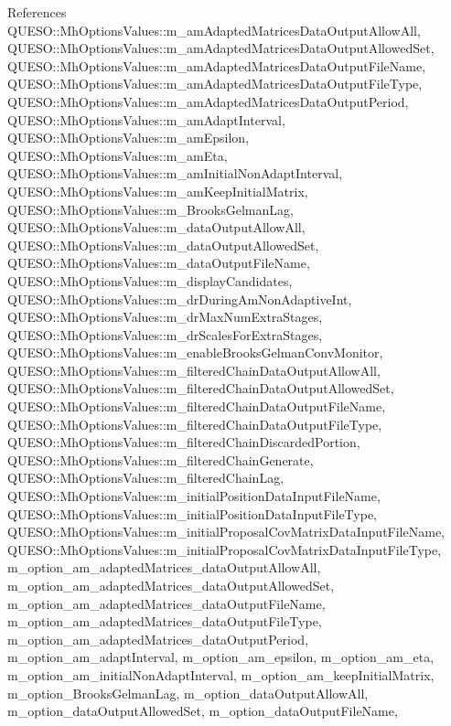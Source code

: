 References Q\-U\-E\-S\-O\-::\-Mh\-Options\-Values\-::m\-\_\-am\-Adapted\-Matrices\-Data\-Output\-Allow\-All, Q\-U\-E\-S\-O\-::\-Mh\-Options\-Values\-::m\-\_\-am\-Adapted\-Matrices\-Data\-Output\-Allowed\-Set, Q\-U\-E\-S\-O\-::\-Mh\-Options\-Values\-::m\-\_\-am\-Adapted\-Matrices\-Data\-Output\-File\-Name, Q\-U\-E\-S\-O\-::\-Mh\-Options\-Values\-::m\-\_\-am\-Adapted\-Matrices\-Data\-Output\-File\-Type, Q\-U\-E\-S\-O\-::\-Mh\-Options\-Values\-::m\-\_\-am\-Adapted\-Matrices\-Data\-Output\-Period, Q\-U\-E\-S\-O\-::\-Mh\-Options\-Values\-::m\-\_\-am\-Adapt\-Interval, Q\-U\-E\-S\-O\-::\-Mh\-Options\-Values\-::m\-\_\-am\-Epsilon, Q\-U\-E\-S\-O\-::\-Mh\-Options\-Values\-::m\-\_\-am\-Eta, Q\-U\-E\-S\-O\-::\-Mh\-Options\-Values\-::m\-\_\-am\-Initial\-Non\-Adapt\-Interval, Q\-U\-E\-S\-O\-::\-Mh\-Options\-Values\-::m\-\_\-am\-Keep\-Initial\-Matrix, Q\-U\-E\-S\-O\-::\-Mh\-Options\-Values\-::m\-\_\-\-Brooks\-Gelman\-Lag, Q\-U\-E\-S\-O\-::\-Mh\-Options\-Values\-::m\-\_\-data\-Output\-Allow\-All, Q\-U\-E\-S\-O\-::\-Mh\-Options\-Values\-::m\-\_\-data\-Output\-Allowed\-Set, Q\-U\-E\-S\-O\-::\-Mh\-Options\-Values\-::m\-\_\-data\-Output\-File\-Name, Q\-U\-E\-S\-O\-::\-Mh\-Options\-Values\-::m\-\_\-display\-Candidates, Q\-U\-E\-S\-O\-::\-Mh\-Options\-Values\-::m\-\_\-dr\-During\-Am\-Non\-Adaptive\-Int, Q\-U\-E\-S\-O\-::\-Mh\-Options\-Values\-::m\-\_\-dr\-Max\-Num\-Extra\-Stages, Q\-U\-E\-S\-O\-::\-Mh\-Options\-Values\-::m\-\_\-dr\-Scales\-For\-Extra\-Stages, Q\-U\-E\-S\-O\-::\-Mh\-Options\-Values\-::m\-\_\-enable\-Brooks\-Gelman\-Conv\-Monitor, Q\-U\-E\-S\-O\-::\-Mh\-Options\-Values\-::m\-\_\-filtered\-Chain\-Data\-Output\-Allow\-All, Q\-U\-E\-S\-O\-::\-Mh\-Options\-Values\-::m\-\_\-filtered\-Chain\-Data\-Output\-Allowed\-Set, Q\-U\-E\-S\-O\-::\-Mh\-Options\-Values\-::m\-\_\-filtered\-Chain\-Data\-Output\-File\-Name, Q\-U\-E\-S\-O\-::\-Mh\-Options\-Values\-::m\-\_\-filtered\-Chain\-Data\-Output\-File\-Type, Q\-U\-E\-S\-O\-::\-Mh\-Options\-Values\-::m\-\_\-filtered\-Chain\-Discarded\-Portion, Q\-U\-E\-S\-O\-::\-Mh\-Options\-Values\-::m\-\_\-filtered\-Chain\-Generate, Q\-U\-E\-S\-O\-::\-Mh\-Options\-Values\-::m\-\_\-filtered\-Chain\-Lag, Q\-U\-E\-S\-O\-::\-Mh\-Options\-Values\-::m\-\_\-initial\-Position\-Data\-Input\-File\-Name, Q\-U\-E\-S\-O\-::\-Mh\-Options\-Values\-::m\-\_\-initial\-Position\-Data\-Input\-File\-Type, Q\-U\-E\-S\-O\-::\-Mh\-Options\-Values\-::m\-\_\-initial\-Proposal\-Cov\-Matrix\-Data\-Input\-File\-Name, Q\-U\-E\-S\-O\-::\-Mh\-Options\-Values\-::m\-\_\-initial\-Proposal\-Cov\-Matrix\-Data\-Input\-File\-Type, m\-\_\-option\-\_\-am\-\_\-adapted\-Matrices\-\_\-data\-Output\-Allow\-All, m\-\_\-option\-\_\-am\-\_\-adapted\-Matrices\-\_\-data\-Output\-Allowed\-Set, m\-\_\-option\-\_\-am\-\_\-adapted\-Matrices\-\_\-data\-Output\-File\-Name, m\-\_\-option\-\_\-am\-\_\-adapted\-Matrices\-\_\-data\-Output\-File\-Type, m\-\_\-option\-\_\-am\-\_\-adapted\-Matrices\-\_\-data\-Output\-Period, m\-\_\-option\-\_\-am\-\_\-adapt\-Interval, m\-\_\-option\-\_\-am\-\_\-epsilon, m\-\_\-option\-\_\-am\-\_\-eta, m\-\_\-option\-\_\-am\-\_\-initial\-Non\-Adapt\-Interval, m\-\_\-option\-\_\-am\-\_\-keep\-Initial\-Matrix, m\-\_\-option\-\_\-\-Brooks\-Gelman\-Lag, m\-\_\-option\-\_\-data\-Output\-Allow\-All, m\-\_\-option\-\_\-data\-Output\-Allowed\-Set, m\-\_\-option\-\_\-data\-Output\-File\-Name, 